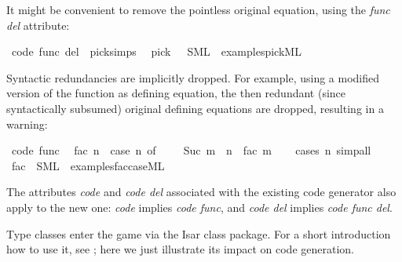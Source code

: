 \begin{isabellebody}
\begin{isamarkuptext}
  \noindent It might be convenient to remove the pointless original
  equation, using the \emph{func del} attribute:%
\end{isamarkuptext}%
\isamarkuptrue%
\isamarkupfalse%
\ {\isacharbrackleft}code\ func\ del{\isacharbrackright}\ {\isacharequal}\ pick{\isachardot}simps\ \isanewline
\isanewline
{}\isamarkupfalse%
\ pick\ \ \ SML\ \ {\isachardoublequoteopen}examples{\isacharslash}pick{}{\isachardot}ML{\isachardoublequoteclose}%
\begin{isamarkuptext}%

  \noindent Syntactic redundancies are implicitly dropped. For example,
  using a modified version of the  function
  as defining equation, the then redundant (since
  syntactically subsumed) original defining equations
  are dropped, resulting in a warning:%
\end{isamarkuptext}%
\isamarkuptrue%
\isamarkupfalse%
\ {\isacharbrackleft}code\ func{\isacharbrackright}{\isacharcolon}\isanewline
\ \ {\isachardoublequoteopen}fac\ n\ {\isacharequal}\ {\isacharparenleft}case\ n\ of\ {}\ {\isasymRightarrow}\ {}\ {\isacharbar}\ Suc\ m\ {\isasymRightarrow}\ n\ {\isacharasterisk}\ fac\ m{\isacharparenright}{\isachardoublequoteclose}\isanewline
%
\isadelimproof
\ \ %
\endisadelimproof
%
\isatagproof
{}\isamarkupfalse%
\ {\isacharparenleft}cases\ n{\isacharparenright}\ simp{\isacharunderscore}all%
\endisatagproof
{\isafoldproof}%
%
\isadelimproof
\isanewline
%
\endisadelimproof
\isanewline
{}\isamarkupfalse%
\ fac\ \ SML\ \ {\isachardoublequoteopen}examples{\isacharslash}fac{\isacharunderscore}case{\isachardot}ML{\isachardoublequoteclose}%
\begin{isamarkuptext}%

  \begin{warn}
    The attributes \emph{code} and \emph{code del}
    associated with the existing code generator also apply to
    the new one: \emph{code} implies \emph{code func},
    and \emph{code del} implies \emph{code func del}.
  \end{warn}%
\end{isamarkuptext}%
\isamarkuptrue%
%
\isamarkuptrue%
%
\begin{isamarkuptext}%
Type classes enter the game via the Isar class package.
  For a short introduction how to use it, see \cite{isabelle-classes};
  here we just illustrate its impact on code generation.


\end{isamarkuptext}
\end{isabellebody}
